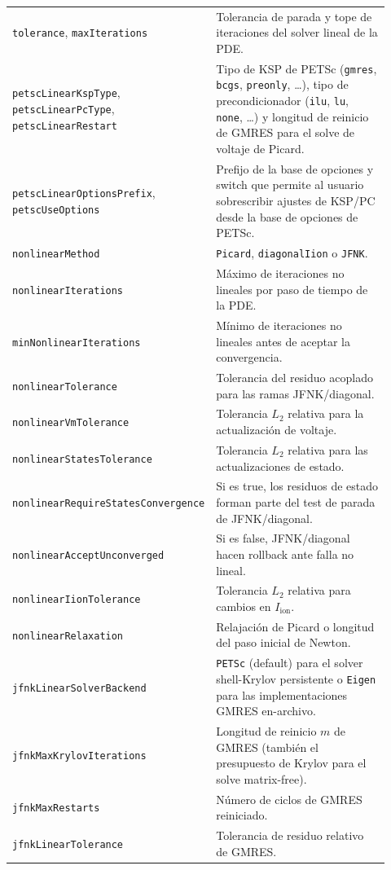 \documentclass[11pt,a4paper]{article}
\newcommand{\code}[1]{\texttt{\small #1}}
\newcommand{\Iion}{I_{\mathrm{ion}}}
\begin{document}
\begin{longtable}{@{}p{0.34\linewidth}p{0.58\linewidth}@{}}
\code{tolerance}, \code{maxIterations} & Tolerancia de parada y tope de iteraciones del solver lineal de la PDE. \\
\code{petscLinearKspType}, \code{petscLinearPcType}, \code{petscLinearRestart} & Tipo de KSP de PETSc (\code{gmres}, \code{bcgs}, \code{preonly}, \ldots), tipo de precondicionador (\code{ilu}, \code{lu}, \code{none}, \ldots) y longitud de reinicio de GMRES para el solve de voltaje de Picard. \\
\code{petscLinearOptionsPrefix}, \code{petscUseOptions} & Prefijo de la base de opciones y switch que permite al usuario sobrescribir ajustes de KSP/PC desde la base de opciones de PETSc. \\
\code{nonlinearMethod} & \code{Picard}, \code{diagonalIion} o \code{JFNK}. \\
\code{nonlinearIterations} & Máximo de iteraciones no lineales por paso de tiempo de la PDE. \\
\code{minNonlinearIterations} & Mínimo de iteraciones no lineales antes de aceptar la convergencia. \\
\code{nonlinearTolerance} & Tolerancia del residuo acoplado para las ramas JFNK/diagonal. \\
\code{nonlinearVmTolerance} & Tolerancia $L_2$ relativa para la actualización de voltaje. \\
\code{nonlinearStatesTolerance} & Tolerancia $L_2$ relativa para las actualizaciones de estado. \\
\code{nonlinearRequireStatesConvergence} & Si es true, los residuos de estado forman parte del test de parada de JFNK/diagonal. \\
\code{nonlinearAcceptUnconverged} & Si es false, JFNK/diagonal hacen rollback ante falla no lineal. \\
\code{nonlinearIionTolerance} & Tolerancia $L_2$ relativa para cambios en $\Iion$. \\
\code{nonlinearRelaxation} & Relajación de Picard o longitud del paso inicial de Newton. \\
\code{jfnkLinearSolverBackend} & \code{PETSc} (default) para el solver shell-Krylov persistente o \code{Eigen} para las implementaciones GMRES en-archivo. \\
\code{jfnkMaxKrylovIterations} & Longitud de reinicio $m$ de GMRES (también el presupuesto de Krylov para el solve matrix-free). \\
\code{jfnkMaxRestarts} & Número de ciclos de GMRES reiniciado. \\
\code{jfnkLinearTolerance} & Tolerancia de residuo relativo de GMRES. \\

\end{longtable}
\end{document}
